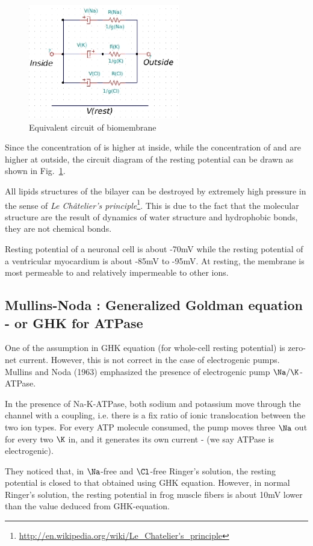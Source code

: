 \begin{figure}[htb]
  \centerline{\includegraphics[height=5cm]{./images/membrane-circuit.eps}}
  \caption{Equivalent circuit of biomembrane}\label{fig:membrane-circuit}
\end{figure}
Since the concentration of  is higher at inside, while the
concentration of  and  are higher at outside, the
circuit diagram of the resting potential can be drawn as shown in
Fig.~\ref{fig:membrane-circuit}.

All lipids structures of the bilayer can be destroyed by extremely
high pressure in the sense of {\it Le Ch\^atelier's principle}\footnote{\url{http://en.wikipedia.org/wiki/Le_Chatelier's_principle}}. This
is due to the fact that the molecular structure are the result of
dynamics of water structure and hydrophobic bonds, they are not
chemical bonds.

Resting potential of a neuronal cell is about -70mV while the resting
potential of a ventricular myocardium is about -85mV to -95mV. At
resting, the membrane is most permeable to  and relatively
impermeable to other ions.





\subsection{Mullins-Noda : Generalized Goldman equation - or GHK for ATPase}
\label{sec:GHK_current-ATPase}
\label{sec:Mullins-Noda-equation}
\label{sec:GHK-generalized}

One of the assumption in GHK equation (for whole-cell resting potential) is
zero-net current. However, this is not correct in the case of electrogenic
pumps. Mullins and Noda (1963) emphasized the presence of electrogenic pump
$\Na/\K$-ATPase. 


\begin{mdframed}
In the presence of Na-K-ATPase, both sodium and potassium move through the
channel with a coupling, i.e. there is a fix ratio of ionic translocation
between the two ion types. For every ATP molecule consumed, the pump moves three
$\Na$ out for every two $\K$ in, and it generates its own current - (we say
ATPase is electrogenic).

They noticed that, in $\Na$-free and $\Cl$-free Ringer's solution, the resting
potential is closed to that obtained using GHK equation. However, in normal
Ringer's solution, the resting potential in frog muscle fibers is about 10mV
lower than the value deduced from GHK-equation.

\end{mdframed}

